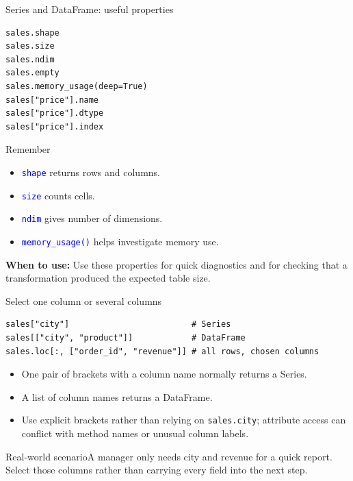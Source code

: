 \documentclass[aspectratio=169,10pt]{beamer}
\newcommand{\scenario}[1]{\begin{block}{Real-world scenario}#1\end{block}}
\newcommand{\whenuse}[1]{\textcolor{CodeGreen}{\textbf{When to use:}} #1}
\newcommand{\method}[1]{\texttt{\textcolor{Blue}{#1}}}
\begin{document}
\begin{frame}[fragile]{Series and DataFrame: useful properties}
\begin{lstlisting}
sales.shape
sales.size
sales.ndim
sales.empty
sales.memory_usage(deep=True)
sales["price"].name
sales["price"].dtype
sales["price"].index
\end{lstlisting}
\begin{block}{Remember}
\begin{itemize}
\item \method{shape} returns rows and columns.
\item \method{size} counts cells.
\item \method{ndim} gives number of dimensions.
\item \method{memory\_usage()} helps investigate memory use.
\end{itemize}
\end{block}
\whenuse{Use these properties for quick diagnostics and for checking that a transformation produced the expected table size.}
\end{frame}

\begin{frame}[fragile]{Select one column or several columns}
\begin{lstlisting}
sales["city"]                         # Series
sales[["city", "product"]]            # DataFrame
sales.loc[:, ["order_id", "revenue"]] # all rows, chosen columns
\end{lstlisting}
\begin{itemize}
\item One pair of brackets with a column name normally returns a Series.
\item A list of column names returns a DataFrame.
\item Use explicit brackets rather than relying on \texttt{sales.city}; attribute access can conflict with method names or unusual column labels.
\end{itemize}
\scenario{A manager only needs city and revenue for a quick report. Select those columns rather than carrying every field into the next step.}
\end{frame}
\end{document}
